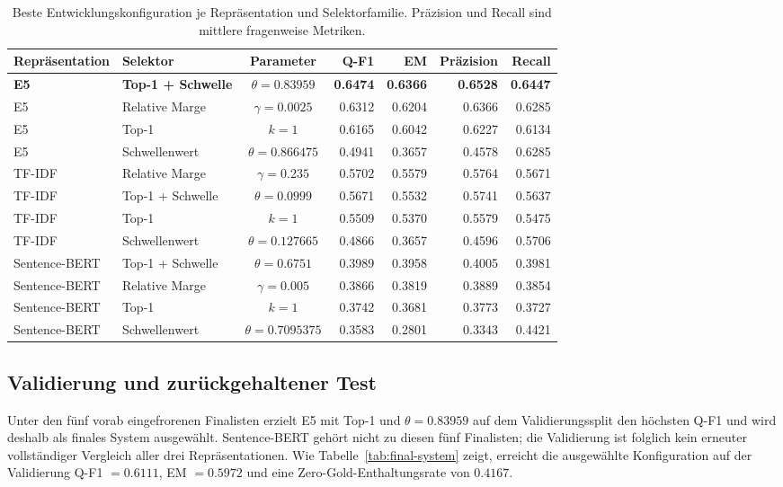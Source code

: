 \documentclass[11pt]{article}
\begin{document}
\begin{table}[t]
\centering
\small
\begin{tabular}{llcrrrr}
\toprule
\textbf{Repräsentation} & \textbf{Selektor} & \textbf{Parameter} & \textbf{Q-F1} & \textbf{EM} & \textbf{Präzision} & \textbf{Recall} \\
\midrule
\textbf{E5} & \textbf{Top-1 + Schwelle} & $\theta=0.83959$ & \textbf{0.6474} & \textbf{0.6366} & \textbf{0.6528} & \textbf{0.6447} \\
E5 & Relative Marge & $\gamma=0.0025$ & 0.6312 & 0.6204 & 0.6366 & 0.6285 \\
E5 & Top-1 & $k=1$ & 0.6165 & 0.6042 & 0.6227 & 0.6134 \\
E5 & Schwellenwert & $\theta=0.866475$ & 0.4941 & 0.3657 & 0.4578 & 0.6285 \\
\midrule
TF-IDF & Relative Marge & $\gamma=0.235$ & 0.5702 & 0.5579 & 0.5764 & 0.5671 \\
TF-IDF & Top-1 + Schwelle & $\theta=0.0999$ & 0.5671 & 0.5532 & 0.5741 & 0.5637 \\
TF-IDF & Top-1 & $k=1$ & 0.5509 & 0.5370 & 0.5579 & 0.5475 \\
TF-IDF & Schwellenwert & $\theta=0.127665$ & 0.4866 & 0.3657 & 0.4596 & 0.5706 \\
\midrule
Sentence-BERT & Top-1 + Schwelle & $\theta=0.6751$ & 0.3989 & 0.3958 & 0.4005 & 0.3981 \\
Sentence-BERT & Relative Marge & $\gamma=0.005$ & 0.3866 & 0.3819 & 0.3889 & 0.3854 \\
Sentence-BERT & Top-1 & $k=1$ & 0.3742 & 0.3681 & 0.3773 & 0.3727 \\
Sentence-BERT & Schwellenwert & $\theta=0.7095375$ & 0.3583 & 0.2801 & 0.3343 & 0.4421 \\
\bottomrule
\end{tabular}
\caption{Beste Entwicklungskonfiguration je Repräsentation und Selektorfamilie. Präzision und Recall sind mittlere fragenweise Metriken.}
\label{tab:development-results}
\end{table}

\subsection{Validierung und zurückgehaltener Test}

Unter den fünf vorab eingefrorenen Finalisten erzielt E5 mit Top-1 und $\theta=0.83959$ auf dem Validierungssplit den höchsten Q-F1 und wird deshalb als finales System ausgewählt. Sentence-BERT gehört nicht zu diesen fünf Finalisten; die Validierung ist folglich kein erneuter vollständiger Vergleich aller drei Repräsentationen. Wie Tabelle~\ref{tab:final-system} zeigt, erreicht die ausgewählte Konfiguration auf der Validierung Q-F1 $=0.6111$, EM $=0.5972$ und eine Zero-Gold-Enthaltungsrate von $0.4167$.
\end{document}
